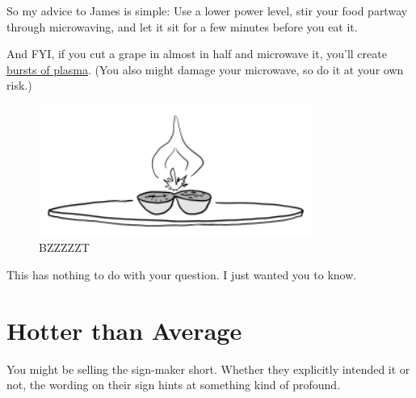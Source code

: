{{So my advice to James is simple: Use a lower power level, stir your food partway through microwaving, and let it sit for a few minutes before you eat it.}

{And FYI, if you cut a grape in almost in half and microwave it, you'll create \href{https://www.youtube.com/results?search\_query=microwave+grape}{bursts of plasma}. (You also might damage your microwave, so do it at your own risk.)}

\begin{figure}[!htbp]
\centering
\includegraphics[scale=0.5, max width=0.8\textwidth]{imgs/a/131/grape.png}
\caption{BZZZZZT}
\end{figure}

{This has nothing to do with your question. I just wanted you to know.}

{
\chapter{Hotter than Average}
}

\hfill{}

{You might be selling the sign-maker short. Whether they explicitly intended it or not, the wording on their sign hints at something kind of profound.}

}
